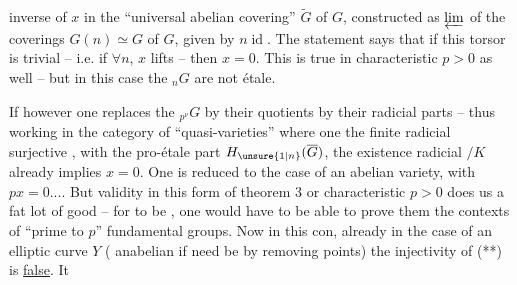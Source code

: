 inverse of $x$ in the ``universal abelian covering'' $\widetilde G$ of $G$, constructed as $\varprojlim$ of the coverings $G(n)\simeq G$ of $G$, given by $n\operatorname{id}$. The statement says that if this torsor is trivial -- i.e. if $\forall n$, $x$ lifts -- then $x=0$. This is true in characteristic $p>0$ as well -- but in this case the ${}_nG$ are not étale.


If however one replaces the ${}_{p^\nu}G$ by their quotients by their radicial parts -- thus working in the category of ``quasi-varieties'' where one   the finite radicial surjective  ,   with the pro-étale part  $H_{\unsure{1|n}}(\overline G)$,  the existence  radicial  $/K$ already implies $x=0$.  One is reduced to the case of an abelian variety, with $px=0$.... But  validity in this form of theorem 3 or  characteristic $p>0$ does us a fat lot of good -- for to be , one would have to be able to prove them   the contexts of ``prime to $p$'' fundamental groups. Now in this con, already in the case of an elliptic curve $Y$ (  anabelian if need be by removing points) the injectivity of (**) is \uline{false}. It

